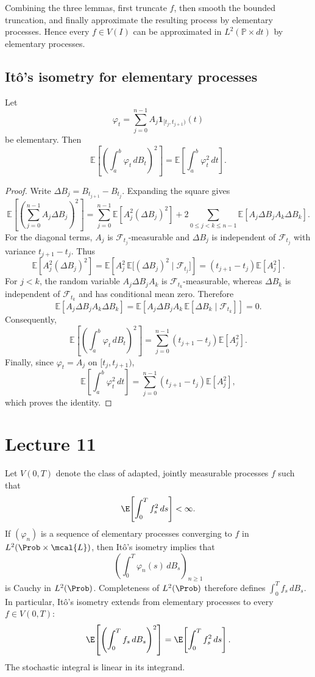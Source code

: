 Combining the three lemmas, first truncate $f$, then smooth the bounded
truncation, and finally approximate the resulting process by elementary
processes. Hence every $f\in V(I)$ can be approximated in
$L^2(\mathbb{P}\times dt)$ by elementary processes.

\subsection*{It\^o's isometry for elementary processes}
\begin{lemma}[It\^o's isometry]
Let
\[
  \varphi_t=\sum_{j=0}^{n-1}A_j\mathbf{1}_{[t_j,t_{j+1})}(t)
\]
be elementary. Then
\[
  \mathbb{E}\left[\left(\int_a^b\varphi_t\,dB_t\right)^2\right]
  =\mathbb{E}\left[\int_a^b\varphi_t^2\,dt\right].
\]
\end{lemma}
\begin{proof}
Write $\Delta B_j=B_{t_{j+1}}-B_{t_j}$. Expanding the square gives
\[
 \mathbb{E}\left[\left(\sum_{j=0}^{n-1}A_j\Delta B_j\right)^2\right]
 =\sum_{j=0}^{n-1}\mathbb{E}[A_j^2(\Delta B_j)^2]
 +2\sum_{0\le j<k\le n-1}\mathbb{E}[A_j\Delta B_jA_k\Delta B_k].
\]
For the diagonal terms, $A_j$ is $\mathcal{F}_{t_j}$-measurable and
$\Delta B_j$ is independent of $\mathcal{F}_{t_j}$ with variance
$t_{j+1}-t_j$. Thus
\[
 \mathbb{E}[A_j^2(\Delta B_j)^2]
 =\mathbb{E}\left[A_j^2\,
 \mathbb{E}\bigl[(\Delta B_j)^2\mid\mathcal{F}_{t_j}\bigr]\right]
 =(t_{j+1}-t_j)\mathbb{E}[A_j^2].
\]
For $j<k$, the random variable $A_j\Delta B_jA_k$ is
$\mathcal{F}_{t_k}$-measurable, whereas $\Delta B_k$ is independent of
$\mathcal{F}_{t_k}$ and has conditional mean zero. Therefore
\[
 \mathbb{E}[A_j\Delta B_jA_k\Delta B_k]
 =\mathbb{E}\left[A_j\Delta B_jA_k\,
 \mathbb{E}[\Delta B_k\mid\mathcal{F}_{t_k}]\right]=0.
\]
Consequently,
\[
 \mathbb{E}\left[\left(\int_a^b\varphi_t\,dB_t\right)^2\right]
 =\sum_{j=0}^{n-1}(t_{j+1}-t_j)\mathbb{E}[A_j^2].
\]
Finally, since $\varphi_t=A_j$ on $[t_j,t_{j+1})$,
\[
 \mathbb{E}\left[\int_a^b\varphi_t^2\,dt\right]
 =\sum_{j=0}^{n-1}(t_{j+1}-t_j)\mathbb{E}[A_j^2],
\]
which proves the identity.
\end{proof}

\section{Lecture 11}
Let $V(0,T)$ denote the class of adapted, jointly measurable processes $f$ such that
\[
  \E\!\left[\int_0^T f_s^2\,ds\right]<\infty.
\]
If $(\varphi_n)$ is a sequence of elementary processes converging to $f$ in
$L^2(\Prob\times \mcal{L})$, then It\^o's isometry implies that
\[
  \left(\int_0^T\varphi_n(s)\,dB_s\right)_{n\ge1}
\]
is Cauchy in $L^2(\Prob)$. Completeness of $L^2(\Prob)$ therefore defines
$\int_0^T f_s\,dB_s$. In particular, It\^o's isometry extends from elementary
processes to every $f\in V(0,T)$:
\[
  \E\!\left[\left(\int_0^T f_s\,dB_s\right)^2\right]
  =\E\!\left[\int_0^T f_s^2\,ds\right].
\]
The stochastic integral is linear in its integrand.

